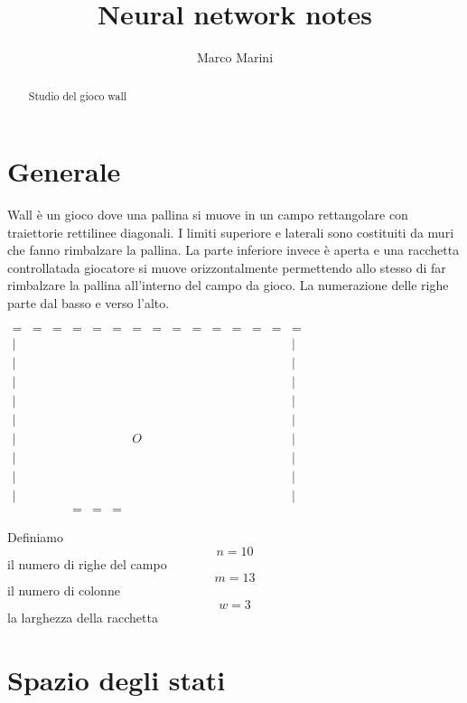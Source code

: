 \documentclass[a4paper,11pt]{article}
\title{Neural network notes}
\author{Marco Marini}
\begin{document}
\maketitle
\tableofcontents

\begin{abstract}
Studio del gioco wall
\end{abstract}

\section{Generale}

Wall è un gioco dove una pallina si muove in un campo rettangolare con traiettorie rettilinee diagonali.
I limiti superiore e laterali sono costituiti da muri che
fanno rimbalzare la pallina.
La parte inferiore invece è aperta e una racchetta controllatada giocatore si muove orizzontalmente
permettendo allo stesso di far rimbalzare la pallina all'interno del campo da gioco.
La numerazione delle righe parte dal basso e verso l'alto.

$
\begin{array}{ccccccccccccccc}
=	& = & = & = & = & = & = & = & = & = & = & = & = & = & = \\
|	&  &  &  &  &  &  &  &  &  &  &  &  &  & | \\ 
|	&  &  &  &  &  &  &  &  &  &  &  &  &  & | \\ 
|	&  &  &  &  &  &  &  &  &  &  &  &  &  & | \\ 
|	&  &  &  &  &  &  &  &  &  &  &  &  &  & | \\ 
|	&  &  &  &  &  &  &  &  &  &  &  &  &  & | \\ 
|	&  &  &  &  &  & O &  &  &  &  &  &  &  & | \\ 
|	&  &  &  &  &  &  &  &  &  &  &  &  &  & | \\ 
|	&  &  &  &  &  &  &  &  &  &  &  &  &  & | \\ 
|	&  &  &  &  &  &  &  &  &  &  &  &  &  & | \\ 
	&  &  & = & = & = &  &  &  &  &  &  &  &  & 
\end{array} 
$

Definiamo 
\[ n = 10 \] il numero di righe del campo
\[ m = 13 \] il numero di colonne
\[ w = 3 \] la larghezza della racchetta


\section{Spazio degli stati}
\end{document}
